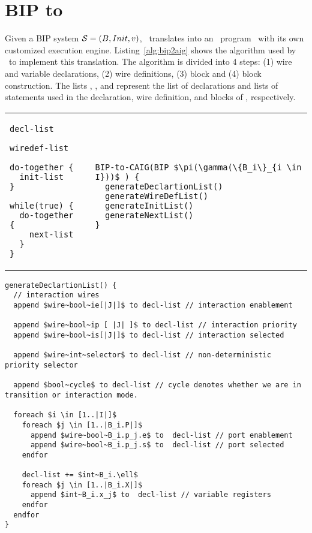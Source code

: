 
\section{BIP to \thislanguage}
\label{chap3:bip2aig:bip2etc}
Given a BIP system $\mathcal{S} = (B, Init, v)$, \biptool~translates \Pm into 
an \thislanguage~program \aigcircuit~with its own customized execution engine. 
Listing~\ref{alg:bip2aig} shows the algorithm used by \biptool~to implement 
this translation. The algorithm is divided into 4 steps: (1) wire and variable
declarations, (2) wire definitions, (3)  block and (4)  block construction. 
The lists , ,  and 
represent the list of declarations and lists of statements used in the 
declaration, wire definition,  and  blocks of \aigcircuit, respectively. 

\begin{tabular}{p{7cm} p{1cm} p{7cm}}
\begin{lstlisting}
decl-list

wiredef-list

do-together {
  init-list
}

while(true) {
  do-together {
    next-list
  }
}
\end{lstlisting}
&
& 
\begin{lstlisting}

BIP-to-CAIG(BIP $\pi(\gamma(\{B_i\}_{i \in I}))$ ) { 
  generateDeclartionList()
  generateWireDefList()
  generateInitList()
  generateNextList()
}
\end{lstlisting}

\end{tabular}


\begin{lstlisting}
generateDeclartionList() {
  // interaction wires
  append $wire~bool~ie[|J|]$ to decl-list // interaction enablement 

  append $wire~bool~ip [ |J| ]$ to decl-list // interaction priority
  append $wire~bool~is[|J|]$ to decl-list // interaction selected

  append $wire~int~selector$ to decl-list // non-deterministic priority selector

  append $bool~cycle$ to decl-list // cycle denotes whether we are in transition or interaction mode. 

  foreach $i \in [1..|I|]$
    foreach $j \in [1..|B_i.P|]$ 
      append $wire~bool~B_i.p_j.e$ to  decl-list // port enablement
      append $wire~bool~B_i.p_j.s$ to  decl-list // port selected
    endfor

    decl-list += $int~B_i.\ell$
    foreach $j \in [1..|B_i.X|]$ 
      append $int~B_i.x_j$ to  decl-list // variable registers
    endfor
  endfor
}
\end{lstlisting}


